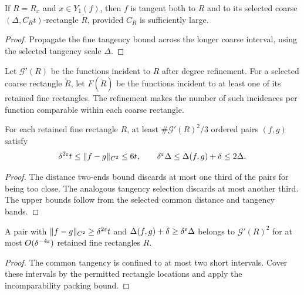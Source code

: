 \begin{lemma}
\label{lem:coarse-tangency}
If $R=R_x$ and $x\in Y_1(f)$, then $f$ is tangent
both to $R$ and to its selected coarse
$(\Delta,C_Rt)$-rectangle $\widetilde R$, provided
$C_R$ is sufficiently large.
\end{lemma}
\begin{proof}
Propagate the fine tangency bound across the longer
coarse interval, using the selected tangency scale
$\Delta$.
\end{proof}

Let $\mathcal G'(R)$ be the functions incident to $R$
after degree refinement. For a selected coarse rectangle
$\widetilde R$, let $F(\widetilde R)$ be the functions
incident to at least one of its retained fine rectangles.
The refinement makes the number of such incidences per
function comparable within each coarse rectangle.

\begin{lemma}
\label{lem:good-function-pairs}
For each retained fine rectangle $R$, at least
$\#\mathcal G'(R)^2/3$ ordered pairs $(f,g)$ satisfy
\[
 \delta^{2\varepsilon}t\leq\|f-g\|_{C^2}\leq6t,
 \qquad
 \delta^\varepsilon\Delta\leq\Delta(f,g)+\delta\leq2\Delta.
\]
\end{lemma}
\begin{proof}
The distance two-ends bound discards at most one third
of the pairs for being too close. The analogous
tangency selection discards at most another third.
The upper bounds follow from the selected common
distance and tangency bands.
\end{proof}

\begin{lemma}
\label{lem:pair-rectangle-count}
A pair with
$\|f-g\|_{C^2}\geq\delta^{2\varepsilon}t$ and
$\Delta(f,g)+\delta\geq\delta^\varepsilon\Delta$
belongs to $\mathcal G'(R)^2$ for at most
$O(\delta^{-4\varepsilon})$ retained fine rectangles $R$.
\end{lemma}
\begin{proof}
The common tangency is confined to at most two short
intervals. Cover these intervals by the permitted
rectangle locations and apply the incomparability
packing bound.
\end{proof}

